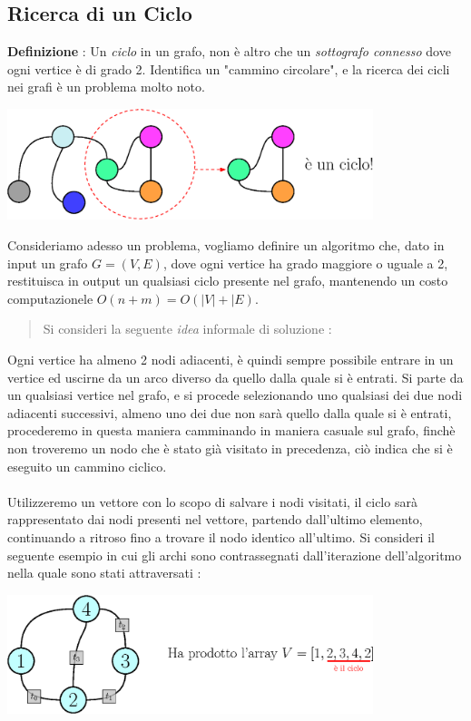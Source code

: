 \documentclass[12pt, letterpaper]{article}
\newcommand{\acc}{\\\hphantom{}\\}
\begin{document}
\subsection{Ricerca di un Ciclo}
\textbf{Definizione} : Un \textit{ciclo} in un grafo, non è altro che un \textit{sottografo connesso} dove
ogni vertice è di grado 2. Identifica un "cammino circolare", e la ricerca dei cicli nei grafi è un
problema molto noto.\begin{center}
    \includegraphics[width=0.8\textwidth ]{images/ciclo.eps}
\end{center}
Consideriamo adesso un problema, vogliamo definire un algoritmo che, dato in input un grafo \(G=(V,E)\), dove ogni
vertice ha grado maggiore o uguale a 2, restituisca in output un qualsiasi ciclo presente nel grafo, mantenendo
un costo computazionele $O(n+m)=O(|V|+|E)$.
\begin{quote}
    Si consideri la seguente \textit{idea} informale di soluzione : \end{quote}
Ogni vertice ha almeno 2 nodi adiacenti, è quindi sempre possibile entrare in un vertice ed uscirne da un
arco diverso da quello dalla quale si è entrati. Si parte da un qualsiasi vertice nel grafo, e si procede
selezionando uno qualsiasi dei due nodi adiacenti successivi, almeno uno dei due non sarà quello dalla
quale si è entrati, procederemo in questa maniera camminando in maniera casuale sul grafo, finchè non troveremo
un nodo che è stato già visitato in precedenza, ciò indica che si è eseguito un cammino ciclico.\acc
Utilizzeremo un vettore con lo scopo di salvare i nodi visitati, il ciclo sarà rappresentato
dai nodi presenti nel vettore, partendo dall'ultimo elemento, continuando a ritroso fino a trovare il nodo
identico all'ultimo. Si consideri il seguente esempio in cui gli archi sono contrassegnati dall'iterazione
dell'algoritmo nella quale sono stati attraversati :
\begin{center}
    \includegraphics[width=0.8\textwidth ]{images/algoCiclo.eps}
\end{center}
\end{document}
